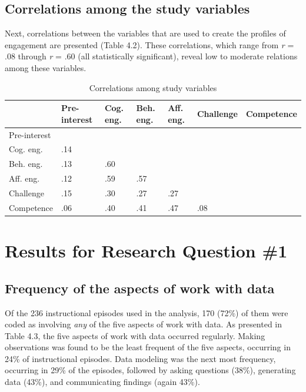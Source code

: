 \documentclass[]{msu-thesis}
\theoremstyle{definition}
\theoremstyle{definition}
\theoremstyle{definition}
\theoremstyle{remark}
\begin{document}
\subsection{Correlations among the study
variables}\label{correlations-among-the-study-variables}

Next, correlations between the variables that are used to create the
profiles of engagement are presented (Table 4.2). These correlations,
which range from \emph{r} = .08 through \emph{r} = .60 (all
statistically significant), reveal low to moderate relations among these
variables.

\begin{table}

\caption{\label{tab:unnamed-chunk-8}Correlations among study variables}
\centering
\begin{tabular}[t]{lllllll}
\toprule
 & Pre-interest & Cog. eng. & Beh. eng. & Aff. eng. & Challenge & Competence\\
\midrule
Pre-interest &  &  &  &  &  & \\
Cog. eng. & .14 &  &  &  &  & \\
Beh. eng. & .13 & .60 &  &  &  & \\
Aff. eng. & .12 & .59 & .57 &  &  & \\
Challenge & .15 & .30 & .27 & .27 &  & \\
Competence & .06 & .40 & .41 & .47 & .08 & \\
\bottomrule
\end{tabular}
\end{table}

\section{Results for Research Question
\#1}\label{results-for-research-question-1}

\subsection{Frequency of the aspects of work with
data}\label{frequency-of-the-aspects-of-work-with-data}

Of the 236 instructional episodes used in the analysis, 170 (72\%) of
them were coded as involving \emph{any} of the five aspects of work with
data. As presented in Table 4.3, the five aspects of work with data
occurred regularly. Making observations was found to be the least
frequent of the five aspects, occurring in 24\% of instructional
episodes. Data modeling was the next most frequency, occurring in 29\%
of the episodes, followed by asking questions (38\%), generating data
(43\%), and communicating findings (again 43\%).
\end{document}
